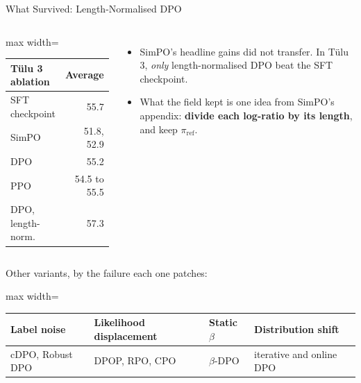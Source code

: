 \begin{frame}{What Survived: Length-Normalised DPO}
    \begin{columns}[T,onlytextwidth]
        \centering
        \footnotesize
        \begin{adjustbox}{max width=\linewidth}\begin{tabular}{lr}
            \toprule
            \textbf{T\"ulu 3 ablation} & \textbf{Average} \\
            \midrule
            SFT checkpoint & 55.7 \\
            SimPO & 51.8, 52.9 \\
            DPO & 55.2 \\
            PPO & 54.5 to 55.5 \\
            \rowcolor{KAUSTcyan!12} DPO, length-norm. & 57.3 \\
            \bottomrule
        \end{tabular}\end{adjustbox}
        \begin{itemize}\itemsep0.35em
            \item SimPO's headline gains did not transfer. In T\"ulu 3, \emph{only} length-normalised DPO beat the SFT checkpoint.
            \item What the field kept is one idea from SimPO's appendix: \textbf{divide each log-ratio by its length}, and keep $\pi_{\text{ref}}$.
        \end{itemize}
    \end{columns}
    \vspace{0.3em}
    {\footnotesize Other variants, by the failure each one patches:}
    \begin{center}
    \footnotesize
    \begin{adjustbox}{max width=\linewidth}\begin{tabular}{llll}
        \toprule
        \textbf{Label noise} & \textbf{Likelihood displacement} & \textbf{Static $\beta$} & \textbf{Distribution shift} \\
        \midrule
        cDPO, Robust DPO & DPOP, RPO, CPO & $\beta$-DPO & iterative and online DPO \\
        \bottomrule
    \end{tabular}\end{adjustbox}
    \end{center}
\end{frame}

